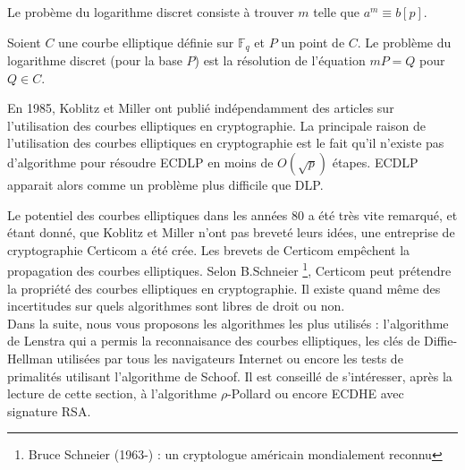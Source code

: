 \documentclass[a4paper]{article}
\begin{document}
\begin{definition}[DLP]
Le probème du logarithme discret consiste à trouver $m$ telle que $a^m \equiv b [p]$.
\end{definition}
\begin{definition} [ECDLP]
Soient $C$ une courbe elliptique définie sur $\mathbb{F}_{q}$ et $P$ un point de $C$.
Le problème du logarithme discret (pour la base $P$) est la résolution de l'équation $mP=Q$  pour $Q \in C$.
\end{definition}





\noindent En 1985, Koblitz \cite{ref12} et Miller \cite{ref13} ont publié indépendamment des articles sur l'utilisation des courbes elliptiques en cryptographie. La principale raison de l'utilisation des courbes elliptiques en cryptographie est le fait qu'il n'existe pas d'algorithme pour résoudre ECDLP en moins de $O(\sqrt{p})$ étapes.
ECDLP apparait alors comme un problème plus difficile que DLP.

\noindent Le potentiel des courbes elliptiques dans les années 80 a été très vite remarqué, et étant donné, que Koblitz et Miller n'ont pas breveté leurs idées, une entreprise de cryptographie Certicom a été crée. Les brevets de Certicom empêchent la propagation des courbes elliptiques. Selon B.Schneier \footnote{Bruce Schneier (1963-) : un cryptologue américain mondialement reconnu}, Certicom peut prétendre la propriété des courbes elliptiques en cryptographie. Il existe quand même des incertitudes sur quels algorithmes sont libres de droit ou non. \\
Dans la suite, nous vous proposons les algorithmes les plus utilisés : l'algorithme de Lenstra qui a permis la reconnaisance des courbes elliptiques, les clés de Diffie-Hellman utilisées par tous les navigateurs Internet ou encore les tests de primalités utilisant l'algorithme de Schoof.
Il est conseillé de s'intéresser, après la lecture de cette section, à l'algorithme $\rho$-Pollard ou encore ECDHE avec signature RSA.
\end{document}

